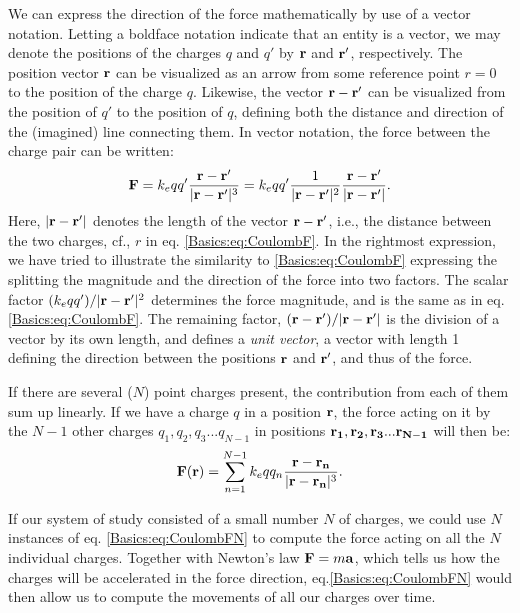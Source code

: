 We can express the direction of the force mathematically by use of a vector notation. Letting a boldface notation indicate that an entity is a vector, we may denote the positions of the charges $q$ and $q'$ by ${\bf r}$ and ${\bf r'}$, respectively. The position vector ${\bf r}$ can be visualized as an arrow from some reference point $r=0$ to the position of the charge $q$. Likewise, the vector ${\bf r}-{\bf r'}$ can be visualized from the position of $q'$ to the position of $q$, defining both the distance and direction of the (imagined) line connecting them. In vector notation, the force between the charge pair can be written:
\begin{equation}
{\bf F} = k_e q q' \frac{{\bf r}-{\bf r'}}{|{\bf r}-{\bf r'}|^3} = k_e  qq'  \frac{1}{|{\bf r}-{\bf r'}|^2} \frac{{\bf r}-{\bf r'}}{|{\bf r}-{\bf r'}|}.
\label{Basics:eq:CoulombFvec}
\end{equation}
Here, $|{\bf r}-{\bf r'}|$ denotes the length of the vector ${\bf r}-{\bf r'}$, i.e., the distance between the two charges, cf., $r$ in eq. \ref{Basics:eq:CoulombF}. In the rightmost expression, we have tried to illustrate the similarity to \ref{Basics:eq:CoulombF} expressing the splitting the magnitude and the direction of the force into two factors. The scalar factor $(k_e qq')/|{\bf r}-{\bf r'}|^2$ determines the force magnitude, and is the same as in eq. \ref{Basics:eq:CoulombF}. The remaining factor, $({\bf r}-{\bf r'})/|{\bf r}-{\bf r'}|$ is the division of a vector by its own length, and defines a \textit{unit vector}, a vector with length 1 defining the direction between the positions ${\bf r}$ and ${\bf r'}$, and thus of the force. 

If there are several ($N$) point charges present, the contribution from each of them sum up linearly. If we have a charge $q$ in a position ${\bf r}$, the force acting on it by the $N-1$ other charges $q_1, q_2, q_3 ... q_{N-1}$ in positions ${\bf r_1}, {\bf r_2}, {\bf r_3} ... {\bf r_{N-1}}$ will then be:
\begin{equation}
{\bf F}({\bf r}) = \sum_{n=1}^{N-1} k_e q q_n \frac{{\bf r}-{\bf r_n}}{|{\bf r}-{\bf r_n}|^3}.
\label{Basics:eq:CoulombFN}
\end{equation}

If our system of study consisted of a small number $N$ of charges, we could use $N$ instances of eq. \ref{Basics:eq:CoulombFN} to compute the force acting on all the $N$ individual charges. Together with Newton's law ${\bf F} = m {\bf a}$, which tells us how the charges will be accelerated in the force direction, eq.\ref{Basics:eq:CoulombFN} would then allow us to compute the movements of all our charges over time. 

